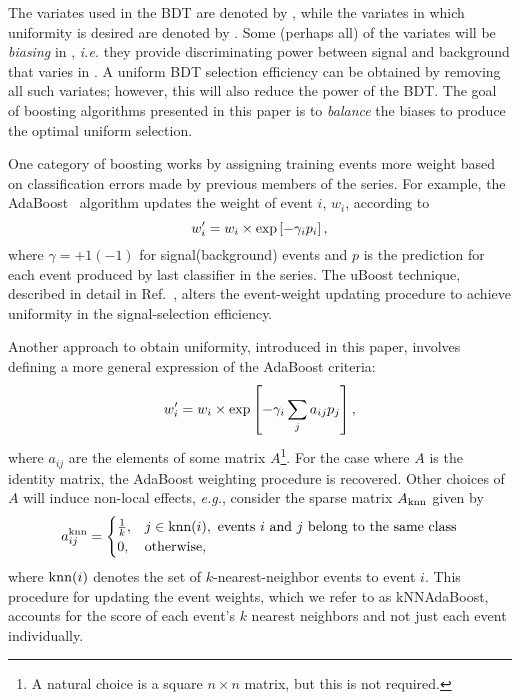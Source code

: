 The variates used in the BDT are denoted by \x, while the variates in which uniformity is desired are denoted by \y.  Some (perhaps all) of the \x variates will be {\em biasing} in \y, {\em i.e.} they provide discriminating power between signal and background that varies in \y.  A uniform BDT selection efficiency can be obtained by removing all such variates; however, this will also reduce the power of the BDT.  The goal of boosting algorithms presented in this paper is to {\em balance} the biases to produce the optimal uniform selection.

One category of boosting works by assigning training events more weight based on classification errors made by previous members of the series.  For example, the AdaBoost~\cite{ref:FS1997} algorithm updates the weight of event $i$, $w_i$, according to
\begin{equation}
w_i^{\prime} = w_i \times {\rm exp}\left[-\gamma_i p_i\right], 
\end{equation}
where $\gamma = +1(-1)$ for signal(background) events and $p$ is the prediction for each event produced by last classifier in the series.  
The uBoost technique, described in detail in Ref.~\cite{ref:uboost}, alters the event-weight updating procedure to achieve uniformity in the signal-selection efficiency. 


Another approach to obtain uniformity, introduced in this paper, involves defining a more general expression of the AdaBoost criteria:
\begin{equation}
 w_i^{\prime} = w_i \times {\rm exp}\left[-\gamma_i \sum_j a_{ij} p_j\right],
\end{equation}
where $a_{ij}$ are the elements of some matrix $A$\footnote{A natural choice is a square $n\times n$ matrix, but this is not required.}.  For the case where $A$ is the identity matrix, the AdaBoost weighting procedure is recovered.  
Other choices of $A$ will induce non-local effects, {\em e.g.}, consider the sparse matrix $A_{\rm knn}$ given by
\begin{equation}
  a_{ij}^{\rm knn} = \begin{cases} 
    \frac{1}{k}, & j \in \text{knn}(i), \text{ events $i$ and $j$ belong to the same class} \\
    0, & \text{otherwise},
\end{cases}
\end{equation}
where $\text{knn}(i)$ denotes the set of $k$-nearest-neighbor events to event $i$.
This procedure for updating the event weights, which we refer to as kNNAdaBoost, accounts for the score of each event's $k$ nearest neighbors and not just each event individually.


